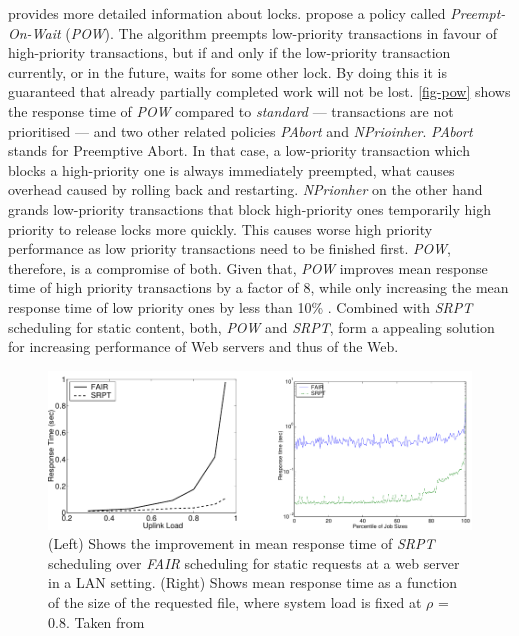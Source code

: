 \documentclass[
  a4paper,               %
  twoside,               %
  headings=small,        %
  DIV=12,                %
  BCOR=1cm,              %
  headinclude=true,      %
  footinclude=true,      %
  numbers=noenddot,      %
  11pt]{scrartcl}        %
\begin{document}
\cite{Callison09} provides more detailed information about locks. \cite{McWherter} propose a policy called \emph{Preempt-On-Wait} (\emph{POW}). The algorithm preempts low-priority transactions in favour of high-priority transactions, but if and only if the low-priority transaction currently, or in the future, waits for some other lock. By doing this it is guaranteed that already partially completed work will not be lost. \autoref{fig-pow} shows the response time of \textit{POW} compared to \textit{standard} --- transactions are not prioritised --- and two other related policies \textit{PAbort} and \textit{NPrioinher}. \textit{PAbort} stands for Preemptive Abort. In that case, a low-priority transaction which blocks a high-priority one is always immediately preempted, what causes overhead caused by rolling back and restarting. \textit{NPrionher} on the other hand grands low-priority transactions that block high-priority ones temporarily high priority to release locks more quickly. This causes worse high priority performance as low priority transactions need to be finished first. \textit{POW}, therefore, is a compromise of both. Given that, \textit{POW} improves mean response time of high priority transactions by a factor of 8, while only increasing the mean response time of low priority ones by less than 10\% \cite{schorederSchedule}. Combined with \textit{SRPT} scheduling for static content, both, \textit{POW} and \textit{SRPT}, form a appealing solution for increasing performance of Web servers and thus of the Web. 




\begin{figure}[h]
\centerline{\includegraphics[width=15cm]{pics/srpt.pdf}}
\caption{(Left) Shows the improvement in mean response time of \textit{SRPT} scheduling over \textit{FAIR} scheduling for static requests at a web
server in a LAN setting. (Right) Shows mean response time as a function of the size of the requested file, where system load is fixed at
$\rho$ = 0.8. Taken from \cite{schorederSchedule}}
\label{fig-srpt}
\end{figure}
\end{document}
